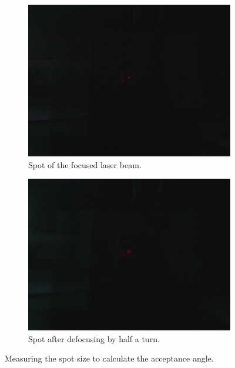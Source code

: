 \documentclass[a4paper, 12pt]{paper}
\begin{document}
\begin{figure}[H]
    \centering
    \begin{subfigure}[b]{0.45\textwidth}
        \includegraphics[width=\textwidth]{img/focus.jpg}
        \caption{Spot of the focused laser beam.}
    \end{subfigure}
    \begin{subfigure}[b]{0.45\textwidth}
        \includegraphics[width=\textwidth]{img/050.jpg}
        \caption{Spot after defocusing by half a turn.}
    \end{subfigure}
    \caption{Measuring the spot size to calculate the acceptance angle.}
\label{fig:spot}
\end{figure}
\end{document}
